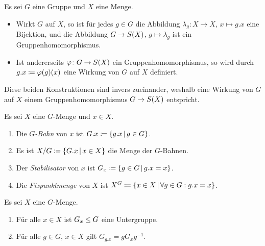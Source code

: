 \noindent
\begin{minipage}[t]{\textwidth}
Es sei $G$ eine Gruppe und $X$ eine Menge.
\begin{itemize}
  \item
    Wirkt $G$ auf $X$, so ist für jedes $g \in G$ die Abbildung $\lambda_g \colon X \to X$, $x \mapsto g.x$ eine Bijektion, und die Abbildung $G \to S(X)$, $g \mapsto \lambda_g$ ist ein Gruppenhomomorphismus.
  \item
    Ist andererseits $\varphi \colon G \to S(X)$ ein Gruppenhomomorphismus, so wird durch $g.x \coloneqq \varphi(g)(x)$ eine Wirkung von $G$ auf $X$ definiert.
\end{itemize}
Diese beiden Konstruktionen sind invers zueinander, weshalb eine Wirkung von $G$ auf $X$ einem Gruppenhomomorphismus $G \to S(X)$ entspricht.
\end{minipage}

\begin{definition}
  Es sei $X$ eine $G$-Menge und $x \in X$.
  \begin{enumerate}
    \item
      Die \emph{$G$-Bahn} von $x$ ist $G.x \defined \{g.x \suchthat g \in G\}$.
    \item
      Es ist $X/G \defined \{G.x \suchthat x \in X\}$ die Menge der $G$-Bahnen.
    \item
      Der \emph{Stabilisator} von $x$ ist $G_x \defined \{g \in G \suchthat g.x = x\}$.
    \item
      Die \emph{Fixpunktmenge} von $X$ ist $X^G \defined \{x \in X \suchthat \forall g \in G: g.x = x\}$.
  \end{enumerate}
\end{definition}

\begin{lemma}
  Es sei $X$ eine $G$-Menge.
  \begin{enumerate}
    \item
      Für alle $x \in X$ ist $G_x \mathrel{\leq} G$ eine Untergruppe.
    \item
      Für alle $g \in G$, $x \in X$ gilt $G_{g.x} = g G_x g^{-1}$.
  \end{enumerate}
\end{lemma}

